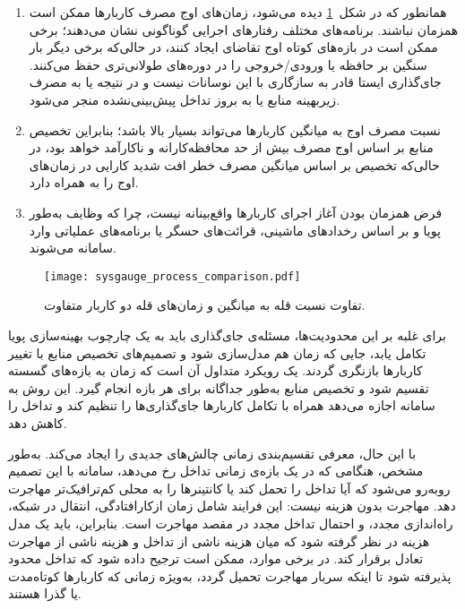 \begin{enumerate}
\item
همانطور که در شکل~\ref{figure:CPU_Comp} دیده می‌شود، زمان‌های اوج مصرف کاربارها ممکن است همزمان نباشند. برنامه‌های مختلف رفتارهای اجرایی گوناگونی نشان می‌دهند؛ برخی ممکن است در بازه‌های کوتاه اوج تقاضای  ایجاد کنند، در حالی‌که برخی دیگر بار سنگین بر حافظه یا ورودی/خروجی را در دوره‌های طولانی‌تری حفظ می‌کنند. جای‌گذاری ایستا قادر به سازگاری با این نوسانات نیست و در نتیجه یا به مصرف زیربهینه منابع یا به بروز تداخل پیش‌بینی‌نشده منجر می‌شود. 

\item
نسبت مصرف اوج به میانگین کاربارها می‌تواند بسیار بالا باشد؛ بنابراین تخصیص منابع بر اساس اوج مصرف بیش از حد محافظه‌کارانه و ناکارآمد خواهد بود، در حالی‌که تخصیص بر اساس میانگین مصرف خطر افت شدید کارایی در زمان‌های اوج را به همراه دارد. 

\item
فرض همزمان بودن آغاز اجرای کاربارها واقع‌بینانه نیست، چرا که وظایف به‌طور پویا و بر اساس رخدادهای ماشینی، قرائت‌های حسگر یا برنامه‌های عملیاتی وارد سامانه می‌شوند.
\end{enumerate}

\vspace{0.5cm}
\begin{figure}[h]
\centering
\texttt{[image: sysgauge\_process\_comparison.pdf]}
\caption{تفاوت نسبت قله به میانگین و زمان‌های قله دو کاربار متفاوت.}
\label{figure:CPU_Comp}
\end{figure}
\vspace{0.5cm}

برای غلبه بر این محدودیت‌ها، مسئله‌ی جای‌گذاری باید به یک چارچوب بهینه‌سازی پویا تکامل یابد، جایی که زمان هم مدل‌سازی شود و تصمیم‌های تخصیص منابع با تغییر کاربارها بازنگری گردند. یک رویکرد متداول آن است که زمان به بازه‌های گسسته تقسیم شود\cite{buchaca2020seq2seq} و تخصیص منابع به‌طور جداگانه برای هر بازه انجام گیرد\cite{Masouros2021Rusty}. این روش به سامانه اجازه می‌دهد همراه با تکامل کاربارها جای‌گذاری‌ها را تنظیم کند و تداخل را کاهش دهد.

با این حال، معرفی تقسیم‌بندی زمانی چالش‌های جدیدی را ایجاد می‌کند. به‌طور مشخص، هنگامی که در یک بازه‌ی زمانی تداخل رخ می‌دهد، سامانه با این تصمیم روبه‌رو می‌شود که آیا تداخل را تحمل کند یا کانتینرها را به محلی کم‌ترافیک‌تر مهاجرت دهد. مهاجرت بدون هزینه نیست: این فرایند شامل زمان ازکارافتادگی، انتقال در شبکه، راه‌اندازی مجدد، و احتمال تداخل مجدد در مقصد مهاجرت است\cite{Javadi2017DIAL}. بنابراین، باید یک مدل هزینه در نظر گرفته شود که میان هزینه ناشی از تداخل و هزینه ناشی از مهاجرت تعادل برقرار کند. در برخی موارد، ممکن است ترجیح داده شود که تداخل محدود پذیرفته شود تا اینکه سربار مهاجرت تحمیل گردد، به‌ویژه زمانی که کاربارها کوتاه‌مدت یا گذرا هستند\cite{Anu2019IALM}.

